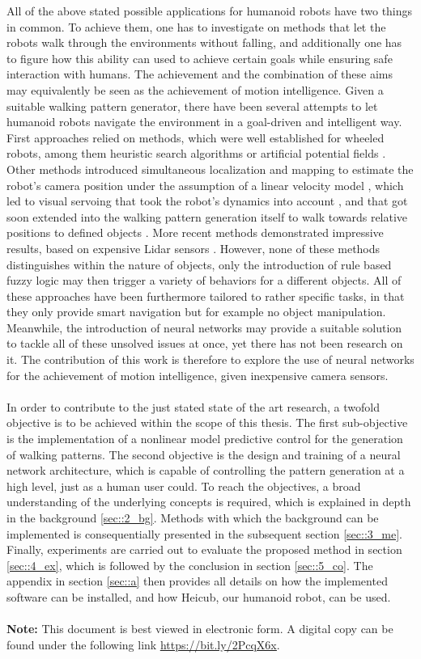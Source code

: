 All of the above stated possible applications for humanoid robots have two things in common. To achieve them, one has to investigate on methods that let the robots walk through the environments without falling, and additionally one has to figure how this ability can used to achieve certain goals while ensuring safe interaction with humans. The achievement and the combination of these aims may equivalently be seen as the achievement of motion intelligence. Given a suitable walking pattern generator, there have been several attempts to let humanoid robots navigate the environment in a goal-driven and intelligent way. First approaches relied on methods, which were well established for wheeled robots, among them heuristic search algorithms or artificial potential fields \cite{kuffner2005motion}. Other methods introduced simultaneous localization and mapping to estimate the robot's camera position under the assumption of a linear velocity model \cite{stasse2008integrating}, which led to visual servoing that took the robot's dynamics into account \cite{dune2010cancelling}, and that got soon extended into the walking pattern generation itself to walk towards relative positions to defined objects \cite{dune2011vision}. More recent methods demonstrated impressive results, based on expensive Lidar sensors \cite{griffin2019footstep}. However, none of these methods distinguishes within the nature of objects, only the introduction of rule based fuzzy logic \cite{dadios2012humanoid} may then trigger a variety of behaviors for a different objects. All of these approaches have been furthermore tailored to rather specific tasks, in that they only provide smart navigation but for example no object manipulation. Meanwhile, the introduction of neural networks may provide a suitable solution to tackle all of these unsolved issues at once, yet there has not been research on it. The contribution of this work is therefore to explore the use of neural networks for the achievement of motion intelligence, given inexpensive camera sensors.
\\\\
In order to contribute to the just stated state of the art research, a twofold objective is to be achieved within the scope of this thesis. The first sub-objective is the implementation of a nonlinear model predictive control for the generation of walking patterns. The second objective is the design and training of a neural network architecture, which is capable of controlling the pattern generation at a high level, just as a human user could. To reach the objectives, a broad understanding of the underlying concepts is required, which is explained in depth in the background \ref{sec::2_bg}. Methods with which the background can be implemented is consequentially presented in the subsequent section \ref{sec::3_me}. Finally, experiments are carried out to evaluate the proposed method in section \ref{sec::4_ex}, which is followed by the conclusion in section \ref{sec::5_co}. The appendix in section \ref{sec::a} then provides all details on how the implemented software can be installed, and how Heicub, our humanoid robot, can be used.
\\\\
\textbf{Note:} This document is best viewed in electronic form. A digital copy can be found under the following link \href{https://bit.ly/2PcqX6x}{\underline{https://bit.ly/2PcqX6x}}.
